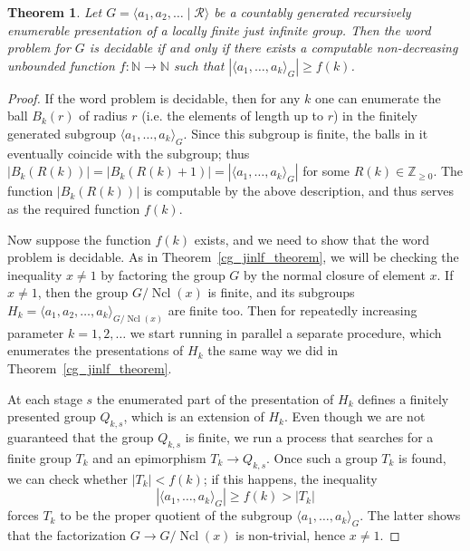 \documentclass[12pt,a4paper]{amsart}
\newtheorem{theorem}{Theorem}
\DeclareMathOperator{\Ncl}{Ncl}
\begin{document}
\begin{theorem}
\label{cg_jilf_theorem}
    Let $G=\langle a_1,a_2,\ldots \mid \mathcal{R} \rangle$ be a countably generated recursively enumerable presentation of a locally finite just infinite group. Then the word problem for $G$  is decidable if and only if there exists a computable non-decreasing unbounded function $f:\mathbb N\to \mathbb N$ such that $|\langle a_1,\ldots,a_k\rangle_G|\geq f(k)$.
\end{theorem}
\begin{proof}
If the word problem is decidable, then for any $k$ one can enumerate the ball $B_k(r)$ of radius $r$ (i.e. the elements of length up to $r$) in the finitely generated subgroup $\langle a_1,\ldots,a_k\rangle_G$. Since this subgroup is finite, the balls in it eventually coincide with the subgroup; thus $|B_k(R(k))|=|B_k(R(k)+1)|=|\langle a_1,\ldots,a_k\rangle_G|$ for some $R(k)\in \mathbb Z_{\geq 0}$. The function $|B_k(R(k))|$
is computable by the above description, and thus serves as the required function $f(k)$.

\smallskip

Now suppose the function $f(k)$ exists, and we need to show that the word problem is decidable. As in Theorem~\ref{cg_jinlf_theorem}, we will be checking the inequality $x\ne 1$ by factoring the group $G$ by the normal closure of element $x$. If $x\ne 1$, then the group $G/\Ncl(x)$ is finite, and its subgroups $H_k=\langle a_1, a_2,\ldots,a_k\rangle_{G/\Ncl(x)}$ are finite too. Then for repeatedly increasing parameter $k=1,2,\ldots$ we start running in parallel a separate procedure, which enumerates the presentations of $H_k$ the same way we did in Theorem~\ref{cg_jinlf_theorem}.

At each stage $s$ the enumerated part of the presentation of $H_k$ defines a finitely presented group $Q_{k,s}$, which is an extension of $H_k$. Even though we are not guaranteed that the group $Q_{k,s}$ is finite, we run a process that searches for a finite group $T_k$ and an epimorphism $T_k\to Q_{k,s}$.  Once such a group $T_k$ is found, we can check whether $|T_k|<f(k)$; if this happens, the inequality
\begin{equation}
|\langle a_1,\ldots,a_k\rangle_G|\geq f(k)>|T_k|
\label{size_est}
\end{equation}
forces $T_k$ to be the proper quotient of the subgroup $\langle a_1,\ldots,a_k\rangle_G$. The latter shows that the factorization $G\to G/\Ncl(x)$ is non-trivial, hence $x\ne 1$.


\end{proof}
\end{document}
